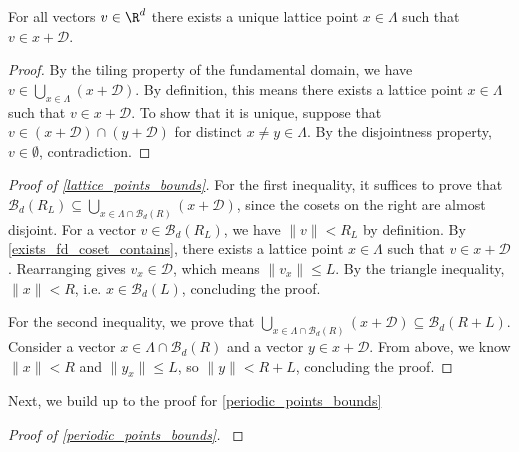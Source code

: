 \begin{lemma}\label{exists_fd_coset_contains}\lean{}
  For all vectors $v \in \R^d$ there exists a unique lattice point $x \in \Lambda$ such that $v \in x + \mathcal{D}$.
\end{lemma}
\begin{proof}
  By the tiling property of the fundamental domain, we have $v \in \bigcup_{x \in \Lambda} (x + \mathcal{D})$. By definition, this means there exists a lattice point $x \in \Lambda$ such that $v \in x + \mathcal{D}$. To show that it is unique, suppose that $v \in (x + \mathcal{D}) \cap (y + \mathcal{D})$ for distinct $x \neq y \in \Lambda$. By the disjointness property, $v \in \emptyset$, contradiction.
\end{proof}

\begin{proof}[Proof of \cref{lattice_points_bounds}]\label{lattice_points_bounds_proof}
  For the first inequality, it suffices to prove that $\mathcal{B}_d(R _ L) \subseteq \bigcup_{x \in \Lambda \cap \mathcal{B}_d(R)} (x + \mathcal{D})$, since the cosets on the right are almost disjoint. For a vector $v \in \mathcal{B}_d(R _ L)$, we have $\|v\| < R _ L$ by definition. By \cref{exists_fd_coset_contains}, there exists a lattice point $x \in \Lambda$ such that $v \in x + \mathcal{D}$. Rearranging gives $v _ x \in \mathcal{D}$, which means $\|v _ x\| \leq L$. By the triangle inequality, $\|x\| < R$, i.e. $x \in \mathcal{B}_d(L)$, concluding the proof.

  For the second inequality, we prove that $\bigcup_{x \in \Lambda \cap \mathcal{B}_d(R)} (x + \mathcal{D}) \subseteq \mathcal{B}_d(R + L)$. Consider a vector $x \in \Lambda \cap \mathcal{B}_d(R)$ and a vector $y \in x + \mathcal{D}$. From above, we know $\|x\| < R$ and $\|y _ x\| \leq L$, so $\|y\| < R + L$, concluding the proof.
\end{proof}

Next, we build up to the proof for \cref{periodic_points_bounds}


\begin{proof}[Proof of \cref{periodic_points_bounds}]\label{periodic_points_bounds_proof}\leanok
\end{proof}
